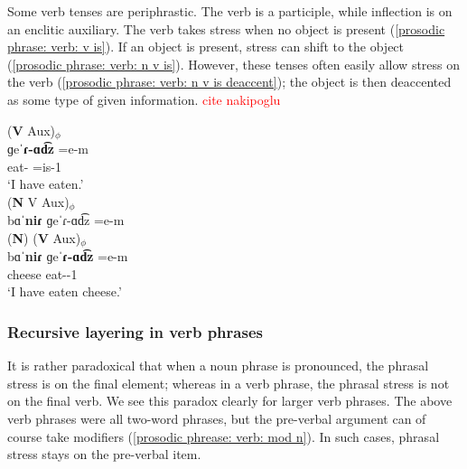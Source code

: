 Some verb tenses are periphrastic. The    verb is a participle, while inflection is on an enclitic auxiliary. The verb takes stress when no object is present (\ref{prosodic phrase: verb: v is}). If an object is present, stress can shift  to the object (\ref{prosodic phrase: verb: n v is}). However, these tenses often easily allow stress on the verb (\ref{prosodic phrase: verb: n v is deaccent}); the object is then deaccented as some type of given information. \textcolor{red}{cite nakipoglu}


\begin{exe}
	\ex \begin{xlist}
		\ex \glll (\textbf{V} Aux)$_\phi$ \\
		ɡeˈ\textbf{ɾ-ɑd͡z} =e-m \\ 
		eat-{\rptcp} =is-1{\sg} \\ 
		\trans `I have eaten.' \label{prosodic phrase: verb: v is}
		\\ 
		\ex \gll (\textbf{N}  {V} Aux)$_\phi$   \\
		bɑˈ\textbf{niɾ} ɡeˈ{ɾ-ɑd͡z} =e-m \\ \label{prosodic phrase: verb: n v is}
		\ex \glll  (\textbf{N})  (\textbf{V} Aux)$_\phi$    \\
		bɑˈ\textbf{niɾ} ɡeˈ\textbf{ɾ-ɑd͡z} =e-m  \\ 
		cheese {\fut} eat-{\thgloss}-1{\sg} \\ 
		\trans `I have eaten cheese.'   \label{prosodic phrase: verb: n v is deaccent}
		\\ 
	\end{xlist}
\end{exe}

\subsubsection{Recursive layering in verb phrases}\label{section:intonation:phrase:verb:rec}
It is rather paradoxical that when a noun phrase is pronounced, the phrasal stress is on the final element; whereas in a verb phrase, the phrasal stress is not on the final verb. We see this paradox clearly for larger verb phrases. The above verb phrases were all two-word phrases, but the pre-verbal argument can of course take modifiers (\ref{prosodic phrease: verb: mod n}). In such cases, phrasal stress stays on the pre-verbal item. 

